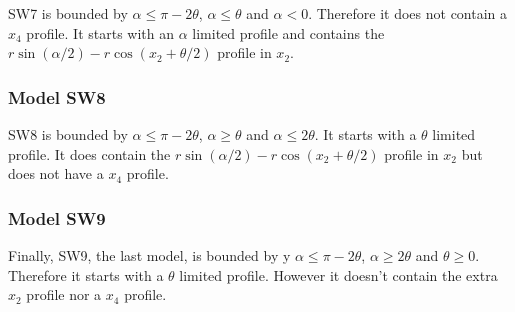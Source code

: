 SW7 is bounded by $\alpha \le \pi - 2\theta$, $\alpha \le \theta$ and $\alpha < 0$. Therefore it does not contain a $x_4$ profile. It starts with an $\alpha$ limited profile and contains the $r\sin(\alpha/2) - r\cos(x_2 + \theta/2)$ profile in $x_2$.




\subsubsection{Model SW8} \label{SW8}

SW8 is bounded by $\alpha \le \pi - 2\theta$, $\alpha \ge \theta$ and $\alpha \le 2\theta$. It starts with a $\theta$ limited profile. It does contain the $r\sin(\alpha/2) - r\cos(x_2 + \theta/2)$ profile in $x_2$ but does not have a $x_4$ profile.

\subsubsection{Model SW9} \label{SW9}

Finally, SW9, the last model, is bounded by y $\alpha \le \pi - 2\theta$, $\alpha \ge 2\theta$ and $\theta \ge 0$. Therefore it starts with a $\theta$ limited profile. However it doesn't contain the extra $x_2$ profile nor a $x_4$ profile.








